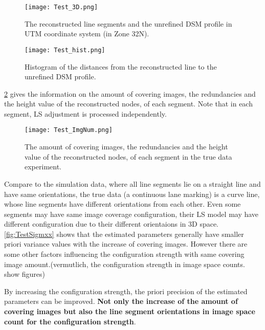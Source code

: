 \begin{figure}
  \centering
  \texttt{[image: Test\_3D.png]}
  \caption{\small The reconstructed line segments and the unrefined DSM profile in UTM coordinate system (in Zone 32N).}
  \label{fig:Test3D}
  \vspace{1cm}
  \texttt{[image: Test\_hist.png]}
  \caption{\small Histogram of the distances from the reconstructed line to the unrefined DSM profile.}
  \label{fig:TestHist}
\end{figure}

\clearpage

\cref{fig:TestImgNum} gives the information on the amount of covering images, the redundancies and the height value of the reconstructed nodes, of each segment. Note that in each segment, LS adjustment is processed independently.

\begin{figure}
  \centering
  \texttt{[image: Test\_ImgNum.png]}
  \caption{\small The amount of covering images, the redundancies and the height value of the reconstructed nodes, of each segment in the true data experiment.}
  \label{fig:TestImgNum}
\end{figure}




Compare to the simulation data, where all line segments lie on a straight line and have same orientations, the true data (a continuous lane marking) is a curve line, whose line segments have different orientations from each other. Even some segments may have same image coverage configuration, their LS model may have different configuration due to their different orientaions in 3D space. \cref{fig:TestSigmxx} shows that the estimated parameters generally have smaller priori variance values with the increase of covering images. However there are some other factors influencing the configuration strength with same covering image amount.(vermutlich, the configuration strength in image space counts. show figures)

By increasing the configuration strength, the priori precision of the estimated parameters can be improved. \textbf{Not only the increase of the amount of covering images but also the line segment orientations in image space count for the configuration strength}.

